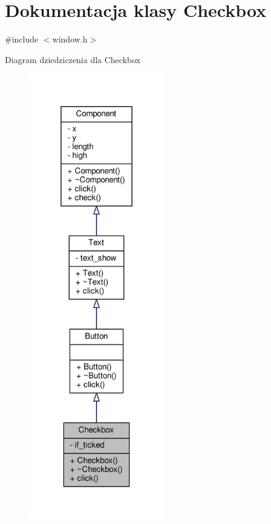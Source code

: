 \hypertarget{classCheckbox}{}\section{Dokumentacja klasy Checkbox}
\label{classCheckbox}


{\ttfamily \#include $<$window.\+h$>$}



Diagram dziedziczenia dla Checkbox
\nopagebreak
\begin{figure}[H]
\begin{center}
\leavevmode
\includegraphics[height=550pt]{classCheckbox__inherit__graph}
\end{center}
\end{figure}


